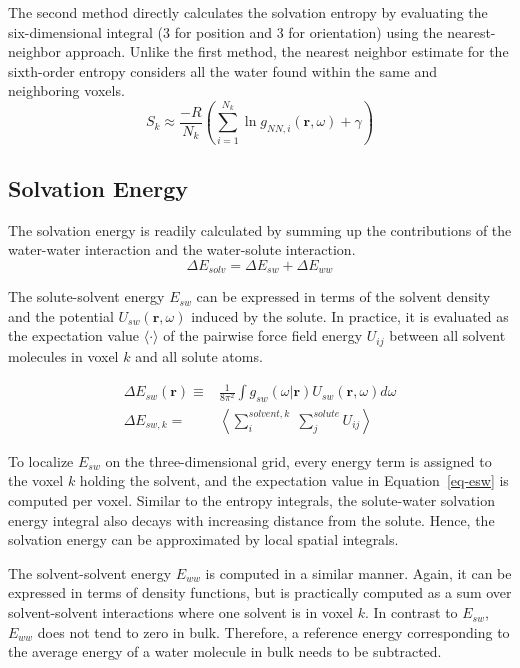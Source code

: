 \documentclass[9pt,tutorial]{livecoms}
\begin{document}
The second method directly calculates the solvation entropy by evaluating the six-dimensional integral (3 for position and 3 for orientation) 
using the nearest-neighbor approach. Unlike the first method, the nearest neighbor estimate for the sixth-order entropy considers all the water 
found within the same and neighboring voxels.  
\begin{equation}
	S_\textit{k} \approx \frac{-R}{N_\textit{k}} \left( \sum _{i=1}^{N_k} \ln g_{NN, \textit{i}} \left( \textbf{r}, \omega \right) + \gamma \right)
\end{equation}


\subsection{Solvation Energy}
The solvation energy is readily calculated by summing up the contributions of the water-water interaction and the water-solute interaction.
\begin{equation}
	\Delta E_\textit{solv} = \Delta E_\textit{sw} + \Delta E_\textit{ww}
\end{equation}

The solute-solvent energy $E_{sw}$ can be expressed in terms of the solvent density and the potential $U_{sw}(\textbf{r},\omega)$ induced by the solute.
In practice, it is evaluated as the expectation value $\langle\cdot\rangle$ of the pairwise force field energy $U_{ij}$ between all solvent molecules in voxel $k$ and all solute atoms.

\begin{equation}
\begin{aligned}
\label{eq-esw}
	\Delta E_{sw}(\textbf{r}) \equiv& \frac{1}{8\pi^2} \int g_\textit{sw}\left(\omega|\textbf{r}\right) U_\textit{sw}\left(\textbf{r}, \omega\right) d\omega \\
	\Delta E_{sw,k}=& \left\langle \sum_i^{\textit{solvent},k} \; \sum_j^\textit{solute} U_{ij}\right\rangle
\end{aligned}
\end{equation}

To localize $E_{sw}$ on the three-dimensional grid, every energy term is assigned to the voxel $k$ holding the solvent, and the expectation value in Equation~\ref{eq-esw} is computed per voxel.
Similar to the entropy integrals, the solute-water solvation energy integral also decays with increasing distance from the solute. Hence, the solvation energy can be approximated by local spatial integrals. 

The solvent-solvent energy $E_{ww}$ is computed in a similar manner.
Again, it can be expressed in terms of density functions, but is practically computed as a sum over solvent-solvent interactions where one solvent is in voxel $k$.
In contrast to $E_{sw}$, $E_{ww}$ does not tend to zero in bulk.
Therefore, a reference energy corresponding to the average energy of a water molecule in bulk needs to be subtracted.
\end{document}

